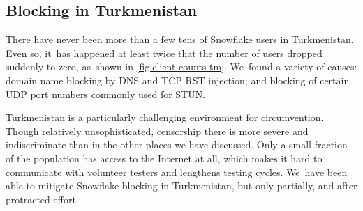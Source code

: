\documentclass[letterpaper,twocolumn]{article}
\begin{document}

\subsection{Blocking in Turkmenistan}
\label{sec:block-tm}

There have never been more than a few tens of Snowflake users in Turkmenistan.
Even so, it~has happened at least twice
that the number of users dropped suddenly to zero,
as~shown in \autoref{fig:client-counts-tm}.
We~found a variety of causes:
domain name blocking
by DNS and TCP RST injection;
and blocking of certain UDP port numbers
commonly used for STUN.

Turkmenistan is a particularly challenging environment for circumvention.
Though relatively unsophisticated, censorship there
is more severe and indiscriminate
than in the other places we have discussed.
Only a small fraction of the population has access to the Internet at all,
which makes it hard to communicate with volunteer testers
and lengthens testing cycles.
We~have been able to mitigate Snowflake blocking in Turkmenistan,
but only partially, and after protracted effort.
\end{document}

